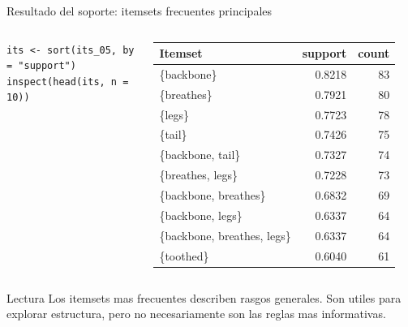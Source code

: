 \documentclass[10pt,aspectratio=169]{beamer}
\begin{document}
\begin{frame}[fragile]{Resultado del soporte: itemsets frecuentes principales}
\begin{columns}[T]
\begin{lstlisting}[style=rcode]
its <- sort(its_05, by = "support")
inspect(head(its, n = 10))
\end{lstlisting}

\scriptsize
\begin{tabular}{lrr}
\toprule
Itemset & support & count \\
\midrule
\{backbone\} & 0.8218 & 83 \\
\{breathes\} & 0.7921 & 80 \\
\{legs\} & 0.7723 & 78 \\
\{tail\} & 0.7426 & 75 \\
\{backbone, tail\} & 0.7327 & 74 \\
\{breathes, legs\} & 0.7228 & 73 \\
\{backbone, breathes\} & 0.6832 & 69 \\
\{backbone, legs\} & 0.6337 & 64 \\
\{backbone, breathes, legs\} & 0.6337 & 64 \\
\{toothed\} & 0.6040 & 61 \\
\bottomrule
\end{tabular}
\end{columns}

\begin{block}{Lectura}
Los itemsets mas frecuentes describen rasgos generales. Son utiles para explorar estructura, pero no necesariamente son las reglas mas informativas.
\end{block}
\end{frame}
\end{document}
